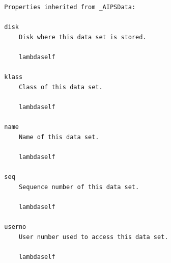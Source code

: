 \documentclass[11pt]{report}
\begin{document}
\begin{verbatim}
  Properties inherited from _AIPSData:
  
  disk
      Disk where this data set is stored.
  
      lambdaself
  
  klass
      Class of this data set.
  
      lambdaself
  
  name
      Name of this data set.
  
      lambdaself
  
  seq
      Sequence number of this data set.
  
      lambdaself
  
  userno
      User number used to access this data set.
  
      lambdaself
\end{verbatim}
\end{document}
